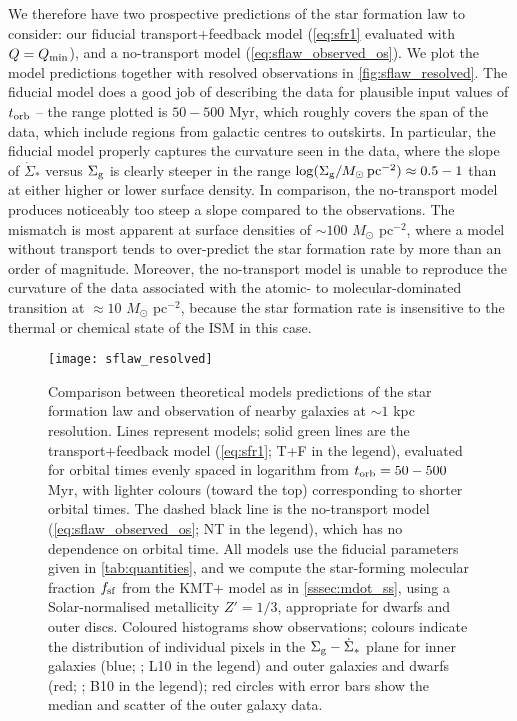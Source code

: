 \documentclass[useAMS,usenatbib]{mn2e}
\newcommand{\Qmin}{Q_{\rm min}}
\begin{document}
We therefore have two prospective predictions of the star formation law to consider: our fiducial transport+feedback model (\autoref{eq:sfr1} evaluated with $Q=\Qmin$), and a no-transport model  (\autoref{eq:sflaw_observed_os}). We plot the model predictions together with resolved observations in \autoref{fig:sflaw_resolved}. The fiducial model does a good job of describing the data for plausible input values of $t_{\rm orb}$ -- the range plotted is $50-500$ Myr, which roughly covers the span of the data, which include regions from galactic centres to outskirts. In particular, the fiducial model properly captures the curvature seen in the data, where the slope of $\dot{\Sigma}_*$ versus $\Sigma_{\rm g}$ is clearly steeper in the range $\log(\Sigma_{\rm g}/M_\odot\,\mathrm{pc}^{-2}) \approx 0.5 - 1$ than at either higher or lower surface density. In comparison, the no-transport model produces noticeably too steep a slope compared to the observations. The mismatch is most apparent at surface densities of $\sim 100$ $M_\odot$ pc$^{-2}$, where a model without transport tends to over-predict the star formation rate by more than an order of magnitude. Moreover, the no-transport model is unable to reproduce the curvature of the data associated with the atomic- to molecular-dominated transition at $\approx 10$ $M_\odot$ pc$^{-2}$, because the star formation rate is insensitive to the thermal or chemical state of the ISM in this case.

\begin{figure}
\texttt{[image: sflaw\_resolved]}
\caption{
\label{fig:sflaw_resolved}
Comparison between theoretical models predictions of the star formation law and observation of nearby galaxies at $\sim 1$ kpc resolution. Lines represent models; solid green lines are the transport+feedback model (\autoref{eq:sfr1}; T+F in the legend), evaluated for orbital times evenly spaced in logarithm from $t_{\rm orb} = 50 - 500$ Myr, with lighter colours (toward the top) corresponding to shorter orbital times. The dashed black line is the no-transport model (\autoref{eq:sflaw_observed_os}; NT in the legend), which has no dependence on orbital time. All models use the fiducial parameters given in \autoref{tab:quantities}, and we compute the star-forming molecular fraction $f_{\rm sf}$ from the KMT+ model  \citep{krumholz13c} as in \autoref{sssec:mdot_ss}, using a Solar-normalised metallicity $Z' = 1/3$, appropriate for dwarfs and outer discs. Coloured histograms show observations; colours indicate the distribution of individual pixels in the $\Sigma_{\rm g} - \dot{\Sigma}_*$ plane for inner galaxies (blue; \citealt{leroy13a}; L10 in the legend) and outer galaxies and dwarfs (red; \citealt{bigiel10a}; B10 in the legend); red circles with error bars show the median and scatter of the outer galaxy data. 
}
\end{figure}
\end{document}
